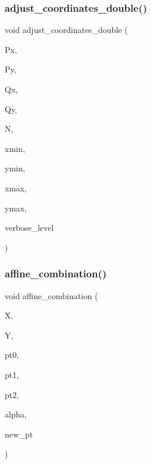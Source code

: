 \subsubsection{\texorpdfstring{adjust\+\_\+coordinates\+\_\+double()}{adjust\_coordinates\_double()}}
{\footnotesize\ttfamily void adjust\+\_\+coordinates\+\_\+double (\begin{DoxyParamCaption}\item[{double $\ast$}]{Px,  }\item[{double $\ast$}]{Py,  }\item[{\mbox{\hyperlink{galois_8h_a09fddde158a3a20bd2dcadb609de11dc}{I\+NT}} $\ast$}]{Qx,  }\item[{\mbox{\hyperlink{galois_8h_a09fddde158a3a20bd2dcadb609de11dc}{I\+NT}} $\ast$}]{Qy,  }\item[{\mbox{\hyperlink{galois_8h_a09fddde158a3a20bd2dcadb609de11dc}{I\+NT}}}]{N,  }\item[{double}]{xmin,  }\item[{double}]{ymin,  }\item[{double}]{xmax,  }\item[{double}]{ymax,  }\item[{\mbox{\hyperlink{galois_8h_a09fddde158a3a20bd2dcadb609de11dc}{I\+NT}}}]{verbose\+\_\+level }\end{DoxyParamCaption})}

\mbox{\label{draw_8_c_a0cc73ffebbfe7a9cc073b005a1e9dedd}} 
\subsubsection{\texorpdfstring{affine\+\_\+combination()}{affine\_combination()}}
{\footnotesize\ttfamily void affine\+\_\+combination (\begin{DoxyParamCaption}\item[{double $\ast$}]{X,  }\item[{double $\ast$}]{Y,  }\item[{\mbox{\hyperlink{galois_8h_a09fddde158a3a20bd2dcadb609de11dc}{I\+NT}}}]{pt0,  }\item[{\mbox{\hyperlink{galois_8h_a09fddde158a3a20bd2dcadb609de11dc}{I\+NT}}}]{pt1,  }\item[{\mbox{\hyperlink{galois_8h_a09fddde158a3a20bd2dcadb609de11dc}{I\+NT}}}]{pt2,  }\item[{double}]{alpha,  }\item[{\mbox{\hyperlink{galois_8h_a09fddde158a3a20bd2dcadb609de11dc}{I\+NT}}}]{new\+\_\+pt }\end{DoxyParamCaption})}

